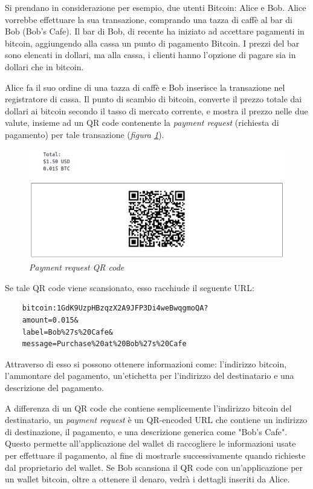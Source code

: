 Si prendano in considerazione per esempio, due utenti Bitcoin: Alice e Bob. Alice vorrebbe effettuare la sua transazione, comprando una tazza di caffè al bar di Bob (Bob's Cafe). Il bar di Bob, di recente ha iniziato ad accettare pagamenti in bitcoin, aggiungendo alla cassa un punto di pagamento Bitcoin. I prezzi del bar sono elencati in dollari, ma alla cassa, i clienti hanno l'opzione di pagare sia in dollari che in bitcoin.

Alice fa il suo ordine di una tazza di caffè e Bob inserisce la transazione nel registratore di cassa. Il punto di scambio di bitcoin, converte il prezzo totale dai dollari ai bitcoin secondo il tasso di mercato corrente, e mostra il prezzo nelle due valute, insieme ad un QR code contenente la \textit{payment request} (richiesta di pagamento) per tale transazione (\textit{figura \ref{fig:qrcode}}).
\begin{figure}[h]
	\centering
	\includegraphics[width= 0.8 \linewidth]{figure/qrcode}
	\caption{\textit{Payment request QR code} \label{fig:qrcode}}
\end{figure}

Se tale QR code viene scansionato, esso racchiude il seguente URL:
\begin{lstlisting}
	bitcoin:1GdK9UzpHBzqzX2A9JFP3Di4weBwqgmoQA?
	amount=0.015&
	label=Bob%27s%20Cafe&
	message=Purchase%20at%20Bob%27s%20Cafe
\end{lstlisting}

Attraverso di esso si possono ottenere informazioni come: l'indirizzo bitcoin, l'ammontare del pagamento, un'etichetta per l'indirizzo del destinatario e una descrizione del pagamento.

A differenza di un QR code che contiene semplicemente l'indirizzo bitcoin del destinatario, un \textit{payment request} è un QR-encoded URL che contiene un indirizzo di destinazione, il pagamento, e una descrizione generica come "Bob's Cafe". Questo permette all'applicazione del wallet di raccogliere le  informazioni usate per effettuare il pagamento, al fine di mostrarle successivamente quando richieste dal proprietario del wallet. Se Bob scansiona il QR code con un'applicazione per un wallet bitcoin, oltre a ottenere il denaro, vedrà i dettagli inseriti da Alice.

